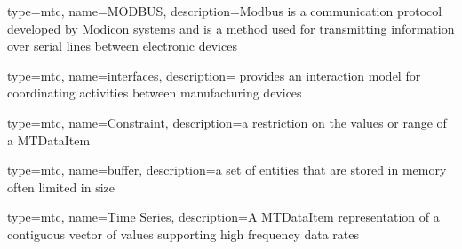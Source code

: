 {
  type=mtc,
  name=MODBUS,
  description={Modbus is a communication protocol developed by Modicon systems and is a method used for transmitting information over serial lines between electronic devices}
}

{
  type=mtc,
  name=interfaces,
  description={\cite{MTCPart5} provides an interaction model for coordinating activities between manufacturing devices}
}

{
  type=mtc,
  name=Constraint,
  description={a restriction on the values or range of a \gls{MTDataItem}}
}

{
  type=mtc,
  name=buffer,
  description={a set of entities that are stored in memory often limited in size}
}

{
  type=mtc,
  name={Time Series},
  description={A \gls{MTDataItem} representation of a contiguous vector of values supporting high frequency data rates}
}



